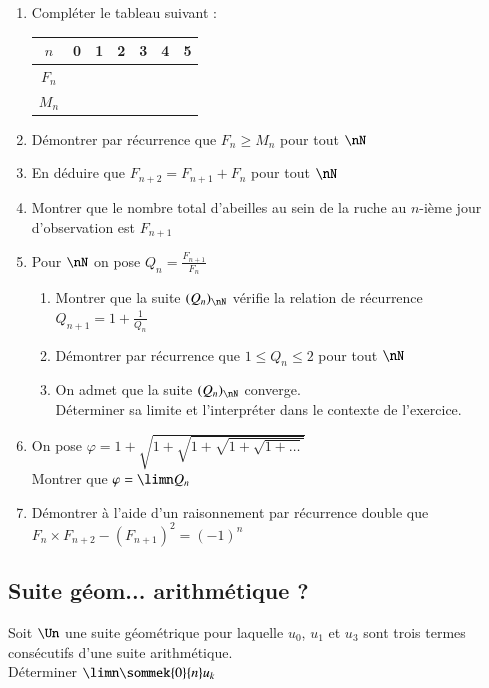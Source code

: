 \documentclass[oneside,12pt]{article}          %
\begin{document}
\begin{enumerate}
    \item Compléter le tableau suivant :
    \begin{center}
        \renewcommand{\arraystretch}{1.5}
        \setlength{\tabcolsep}{25pt}
        \begin{tabular}{|c|c|c|c|c|c|c|}\hline
            $n$ & 0 & 1 & 2 & 3 & 4 & 5 \\ \hline
            $F_n$ & & & & & & \\ \hline
            $M_n$ & & & & & & \\ \hline
        \end{tabular}
    \end{center}

    \item Démontrer par récurrence que $F_n\geq M_n$ pour tout $\nN$
    \item En déduire que $F_{n+2}=F_{n+1}+F_n$ pour tout $\nN$
    \item Montrer que le nombre total d'abeilles au sein de la ruche au $n$-ième jour d'observation est $F_{n+1}$
    \item Pour $\nN$ on pose $Q_n=\frac{F_{n+1}}{F_n}$
    \begin{enumerate}
        \item Montrer que la suite $(Q_n)_{\nN}$ vérifie la relation de récurrence $Q_{n+1}=1+\frac{1}{Q_n}$
        \item Démontrer par récurrence que $1\leq Q_n\leq2$ pour tout $\nN$
        \item On admet que la suite $(Q_n)_{\nN}$ converge.\\Déterminer sa limite et l'interpréter dans le contexte de l'exercice.
    \end{enumerate}
    \item On pose $\varphi = 1+\sqrt{1+\sqrt{1+\sqrt{1+\sqrt{1+\ldots}}}}$\\[5pt]
    Montrer que $\varphi=\limn Q_n$
    \item Démontrer à l'aide d'un raisonnement par récurrence double que $F_n\times F_{n+2}-\left(F_{n+1}\right)^2=(-1)^n$
\end{enumerate}



\subsection{Suite géom... arithmétique ?}
Soit $\Un$ une suite géométrique pour laquelle $u_0$, $u_1$ et $u_3$ sont trois termes consécutifs d'une suite arithmétique.\\
Déterminer $\limn \sommek{0}{n}u_k$
\end{document}
